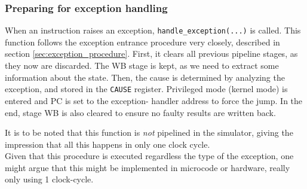 \subsubsection{Preparing for exception handling}
When an instruction raises an exception, \texttt{handle\_exception(...)} is
called. This function follows the exception entrance procedure very closely,
described in section \ref{sec:exception_procedure}.
First, it clears all previous pipeline stages, as they now are discarded. The
WB stage is kept, as we need to extract some information about the state.
Then, the cause is determined by analyzing the exception, and stored in the
\texttt{CAUSE} register.
Privileged mode (kernel mode) is entered and PC is set to the exception-
handler address to force the jump.
In the end, stage WB is also cleared to ensure no faulty results are written
back.
\iffalse
\begin{lstlisting}[language=C]
bzero(&IF_ID, sizeof(struct reg_if_id));
bzero(&ID_EX, sizeof(struct reg_id_ex));
bzero(&EX_MEM, sizeof(struct reg_ex_mem));
/* Data in MEM_WB is still needed */

/* 1. Save EPC */
core->cp0.regs[REG_EPC] = MEM_WB.next_pc - 4;

uint32_t cause = get_cause(MEM_WB.exception, MEM_WB.is_branch_delay);
core->cp0.regs[REG_CAUSE] = cause;

if(MEM_WB.exception == EXC_AddressErrorLoad
   || MEM_WB.exception == EXC_AddressErrorLoad) {
	core->cp0.regs[REG_BADVADDR] = MEM_WB.BadVAddr;
}

core->cp0.regs[REG_SR] |= SR_EXL;

core->regs[REG_PC] = (uint32_t)0x80000080;

bzero(&MEM_WB, sizeof(struct reg_mem_wb));
\end{lstlisting}
\fi
It is to be noted that this function is \emph{not} pipelined in the simulator,
giving the impression that all this happens in only one clock cycle.\\
Given that this procedure is executed regardless the type of the exception, one
might argue that this might be implemented in microcode or hardware, really only
using 1 clock-cycle.

